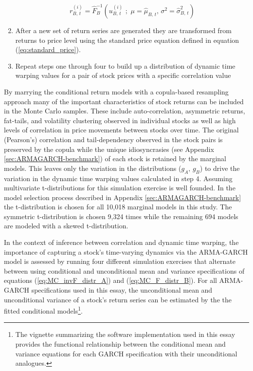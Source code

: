 \begin{enumerate}
\begin{equation}
    \end{equation}
    \begin{equation} \label{eq:MC_invF_distr_B}
        r^{(i)}_{B,\,t} = \hat{F}^{-1}_{B} \left(u^{(i)}_{B,\,t}\,\,;\,\, \mu=\hat{\mu}_{B,\,t},\, \sigma^{2}=\hat{\sigma}^{2}_{B,\,t} \right)
    \end{equation} 
    \item After a new set of return series are generated they are transformed from returns to price level using the standard price equation defined in equation (\ref{eq:standard_price}).
    \item Repeat steps one through four to build up a distribution of dynamic time warping values for a pair of stock prices with a specific correlation value
\end{enumerate}

By marrying the conditional return models with a copula-based resampling approach many of the important characteristics of stock returns can be included in the Monte Carlo samples. These include auto-correlation, asymmetric returns, fat-tails, and volatility clustering observed in individual stocks as well as high levels of correlation in price movements between stocks over time. The original (Pearson's) correlation and tail-dependency observed in the stock pairs is preserved by the copula while the unique idiosyncrasies (see Appendix \ref{sec:ARMAGARCH-benchmark}) of each stock is retained by the marginal models. This leaves only the variation in the distributions ($g_{A},\,g_{B}$) to drive the variation in the dynamic time warping values calculated in step 4. Assuming multivariate t-distributions for this simulation exercise is well founded. In the model selection process described in Appendix \ref{sec:ARMAGARCH-benchmark} the t-distribution is chosen for all 10,018 marginal models in this study. The symmetric t-distribution is chosen 9,324 times while the remaining 694 models are modeled with a skewed t-distribution.

In the context of inference between correlation and dynamic time warping, the importance of capturing a stock's time-varying dynamics via the ARMA-GARCH model is assessed by running four different simulation exercises that alternate between using conditional and unconditional mean and variance specifications of equations (\ref{eq:MC_invF_distr_A}) and (\ref{eq:MC_F_distr_B}). For all ARMA-GARCH specifications used in this essay, the unconditional mean and unconditional variance of a stock's return series can be estimated by the the fitted conditional models\footnote{The vignette \cite{Rugarch} summarizing the software implementation used in this essay provides the functional relationship between the conditional mean and variance equations for each GARCH specification with their unconditional analogues.}.

